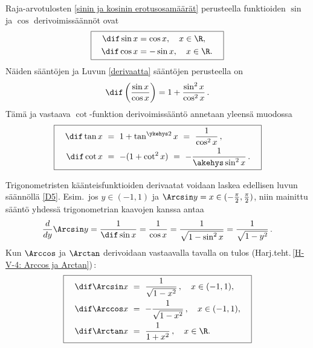 Raja-arvotulosten \eqref{sinin ja kosinin erotusosamäärät} perusteella funktioiden $\sin$ ja 
$\cos$ derivoimissäännöt ovat
\[ \boxed{ \begin{aligned}
\quad \dif\sin x &= \cos x, \quad x\in\R, \\
      \dif\cos x &= -\sin x, \quad x\in\R. \quad
\end{aligned} } \]
Näiden sääntöjen ja Luvun \ref{derivaatta} sääntöjen perusteella on
\[
\dif\left(\frac{\sin x}{\cos x}\right)=1+\frac{\sin^2 x}{\cos^2 x}\,.
\]
Tämä ja vastaava $\cot$-funktion derivoimissääntö annetaan yleensä muodossa
\[ \boxed{ \begin{aligned}
\quad \dif\tan x\ &=\ 1+\tan^{\ykehys 2}x\ =\ \dfrac{1}{\cos^2 x}\,, \\
      \dif\cot x\ &=\ -(1+\cot^2 x)\ =\ -\dfrac{1}{\akehys \sin^2 x}\,. \quad
\end{aligned} } \]

Trigonometristen käänteisfunktioiden derivaatat voidaan laskea edellisen luvun säännöllä
\eqref{D5}. Esim.\ jos $y\in(-1,1)$ ja $\Arcsin y=x\in(-\tfrac{\pi}{2},\tfrac{\pi}{2})$,
niin mainittu sääntö yhdessä trigonometrian kaavojen kanssa antaa
\[
\frac{d}{dy}\Arcsin y = \frac{1}{\dif\sin x} 
                      = \frac{1}{\cos x} 
                      = \frac{1}{\sqrt{1-\sin^2 x}}
                      = \frac{1}{\sqrt{1-y^2}}\,.
\]
Kun $\Arccos$ ja $\Arctan$ derivoidaan vastaavalla tavalla on tulos
(Harj.teht.\,\ref{H-V-4: Arccos ja Arctan})\,:
\[ \boxed{ \begin{aligned}
\quad \dif\Arcsin x\ &=\ \dfrac{1}{\sqrt{1-x^2}}\,, \quad x\in (-1,1), \\
      \dif\Arccos x\ &=\ -\dfrac{1}{\sqrt{1-x^2}}\,, \quad x\in (-1,1), \quad \\
      \dif\Arctan x\ &=\ \dfrac{1}{1+x^2}\,, \quad x\in\R.
\end{aligned} } 
\]

